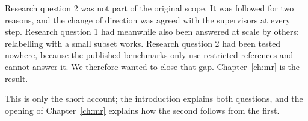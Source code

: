Research question 2 was not part of the original scope. It was
followed for two reasons, and the change of direction was agreed with
the supervisors at every step. Research question 1 had meanwhile also
been answered at scale by others: relabelling with a small subset works.
Research question 2 had been tested nowhere, because the published
benchmarks only use restricted references and cannot answer it. We
therefore wanted to close that gap. Chapter~\ref{ch:mr} is the result.

This is only the short account; the introduction explains both
questions, and the opening of Chapter~\ref{ch:mr} explains how the
second follows from the first.
